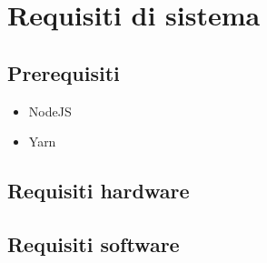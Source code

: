 \section{Requisiti di sistema}
\subsection{Prerequisiti}
\begin{itemize}
  \item NodeJS
  \item Yarn
\end{itemize}
\subsection{Requisiti hardware}

\subsection{Requisiti software}

